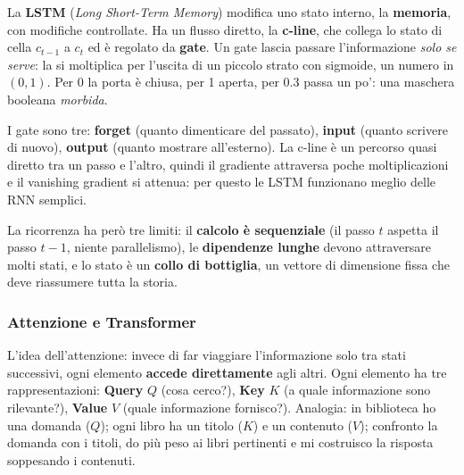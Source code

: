\documentclass[12pt]{extarticle}
\begin{document}
\noindent La \textbf{LSTM} (\emph{Long Short-Term Memory}) modifica uno stato interno, la \textbf{memoria}, con modifiche controllate. Ha un flusso diretto, la \textbf{c-line}, che collega lo stato di cella $c_{t-1}$ a $c_t$ ed è regolato da \textbf{gate}. Un gate lascia passare l'informazione \emph{solo se serve}: la si moltiplica per l'uscita di un piccolo strato con sigmoide, un numero in $(0,1)$. Per 0 la porta è chiusa, per 1 aperta, per 0.3 passa un po': una maschera booleana \emph{morbida}.

\begin{center}
\end{center}

\noindent I gate sono tre: \textbf{forget} (quanto dimenticare del passato), \textbf{input} (quanto scrivere di nuovo), \textbf{output} (quanto mostrare all'esterno). La c-line è un percorso quasi diretto tra un passo e l'altro, quindi il gradiente attraversa poche moltiplicazioni e il vanishing gradient si attenua: per questo le LSTM funzionano meglio delle RNN semplici.

\noindent La ricorrenza ha però tre limiti: il \textbf{calcolo è sequenziale} (il passo $t$ aspetta il passo $t-1$, niente parallelismo), le \textbf{dipendenze lunghe} devono attraversare molti stati, e lo stato è un \textbf{collo di bottiglia}, un vettore di dimensione fissa che deve riassumere tutta la storia.

\subsubsection{Attenzione e Transformer}

\noindent L'idea dell'attenzione: invece di far viaggiare l'informazione solo tra stati successivi, ogni elemento \textbf{accede direttamente} agli altri. Ogni elemento ha tre rappresentazioni: \textbf{Query} $Q$ (cosa cerco?), \textbf{Key} $K$ (a quale informazione sono rilevante?), \textbf{Value} $V$ (quale informazione fornisco?). Analogia: in biblioteca ho una domanda ($Q$); ogni libro ha un titolo ($K$) e un contenuto ($V$); confronto la domanda con i titoli, do più peso ai libri pertinenti e mi costruisco la risposta soppesando i contenuti.
\end{document}

